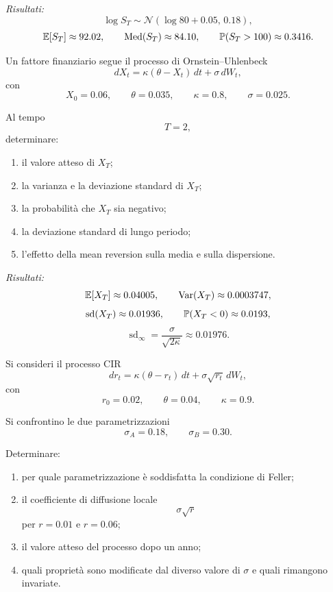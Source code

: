 \noindent
\textit{Risultati:}
\[
\log S_T
\sim
\mathcal{N}
\left(
\log 80+0.05,\,
0.18
\right),
\]
\[
\mathbb{E}[S_T]\approx92.02,
\qquad
\operatorname{Med}(S_T)\approx84.10,
\qquad
\mathbb{P}(S_T>100)\approx0.3416.
\]


\begin{exercise}
\label{ex:cap06-proposto-ou-fattore}

Un fattore finanziario segue il processo di Ornstein--Uhlenbeck
\[
dX_t
=
\kappa(\theta-X_t)\,dt+\sigma\,dW_t,
\]
con
\[
X_0=0.06,
\qquad
\theta=0.035,
\qquad
\kappa=0.8,
\qquad
\sigma=0.025.
\]

Al tempo
\[
T=2,
\]
determinare:

\begin{enumerate}
\item il valore atteso di $X_T$;
\item la varianza e la deviazione standard di $X_T$;
\item la probabilit\`{a} che $X_T$ sia negativo;
\item la deviazione standard di lungo periodo;
\item l'effetto della mean reversion sulla media e sulla dispersione.
\end{enumerate}

\end{exercise}

\noindent
\textit{Risultati:}
\[
\mathbb{E}[X_T]\approx0.04005,
\qquad
\operatorname{Var}(X_T)\approx0.0003747,
\]
\[
\operatorname{sd}(X_T)\approx0.01936,
\qquad
\mathbb{P}(X_T<0)\approx0.0193,
\]
\[
\operatorname{sd}_{\infty}
=
\frac{\sigma}{\sqrt{2\kappa}}
\approx0.01976.
\]


\begin{exercise}
\label{ex:cap06-proposto-cir-parametri}

Si consideri il processo CIR
\[
dr_t
=
\kappa(\theta-r_t)\,dt+\sigma\sqrt{r_t}\,dW_t,
\]
con
\[
r_0=0.02,
\qquad
\theta=0.04,
\qquad
\kappa=0.9.
\]

Si confrontino le due parametrizzazioni
\[
\sigma_A=0.18,
\qquad
\sigma_B=0.30.
\]

Determinare:

\begin{enumerate}
\item per quale parametrizzazione \`{e} soddisfatta la condizione di
Feller;
\item il coefficiente di diffusione locale
\[
\sigma\sqrt{r}
\]
per $r=0.01$ e $r=0.06$;
\item il valore atteso del processo dopo un anno;
\item quali propriet\`{a} sono modificate dal diverso valore di
$\sigma$ e quali rimangono invariate.
\end{enumerate}

\end{exercise}

